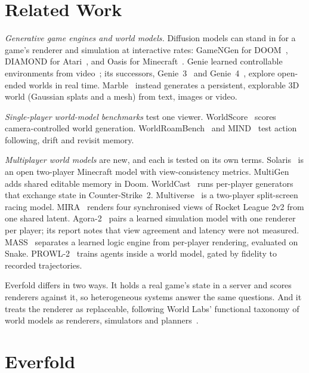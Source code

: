 \documentclass[conference]{IEEEtran}
\begin{document}
\section{Related Work}\label{sec:related}

\emph{Generative game engines and world models.} Diffusion models can stand in for a game's renderer and simulation at interactive rates: GameNGen for DOOM~\cite{gamengen}, DIAMOND for Atari~\cite{diamond}, and Oasis for Minecraft~\cite{oasis}. Genie learned controllable environments from video~\cite{genie}; its successors, Genie~3~\cite{genie3} and Genie~4~\cite{genie4}, explore open-ended worlds in real time. Marble~\cite{marble} instead generates a persistent, explorable 3D world (Gaussian splats and a mesh) from text, images or video.

\emph{Single-player world-model benchmarks} test one viewer. WorldScore~\cite{worldscore} scores camera-controlled world generation. WorldRoamBench~\cite{worldroam} and MIND~\cite{mind} test action following, drift and revisit memory.

\emph{Multiplayer world models} are new, and each is tested on its own terms. Solaris~\cite{solaris} is an open two-player Minecraft model with view-consistency metrics. MultiGen~\cite{multigen} adds shared editable memory in Doom. WorldCast~\cite{worldcast} runs per-player generators that exchange state in Counter-Strike~2. Multiverse~\cite{multiverse} is a two-player split-screen racing model. MIRA~\cite{mira} renders four synchronised views of Rocket League 2v2 from one shared latent. Agora-2~\cite{agora2} pairs a learned simulation model with one renderer per player; its report notes that view agreement and latency were not measured. MASS~\cite{mass} separates a learned logic engine from per-player rendering, evaluated on Snake. PROWL-2~\cite{prowl2} trains agents inside a world model, gated by fidelity to recorded trajectories.

Everfold differs in two ways. It holds a real game's state in a server and scores renderers against it, so heterogeneous systems answer the same questions. And it treats the renderer as replaceable, following World Labs' functional taxonomy of world models as renderers, simulators and planners~\cite{taxonomy}.

\section{Everfold}
\end{document}
